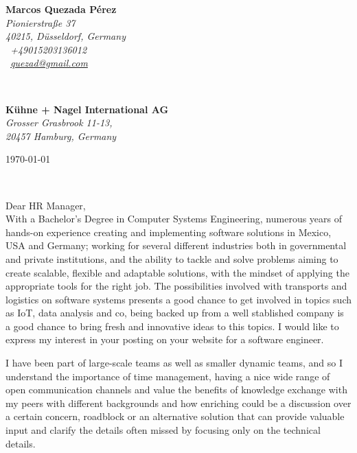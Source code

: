 \documentclass[a4paper,nonstopmode,9.5pt]{article}
\renewcommand{\sffamily}{\rmfamily}
\begin{document}
\sffamily   %
\hfill%
\begin{minipage}[t]{.6\textwidth}
\raggedleft%
{\bfseries Marcos Quezada Pérez}\\[.35ex]
\small\itshape%
Pionierstraße 37\\
40215, Düsseldorf, Germany\\[.35ex]
\Telefon~+49015203136012\\
\Letter~\href{mailto:quezad@gmail.com}{quezad@gmail.com}
\end{minipage}\\[1em]
%
\begin{minipage}[t]{.4\textwidth}
\raggedright%
{\bfseries Kühne + Nagel International AG}\\[.35ex]
\small\itshape%
Grosser Grasbrook 11-13,\\
20457 Hamburg, Germany
\end{minipage}
\hfill %
\begin{minipage}[t]{.4\textwidth}
\raggedleft %
\today
\end{minipage}\\[2em]
\raggedright
Dear HR Manager,\\[1.5em]
%
With a Bachelor’s Degree in Computer Systems Engineering, numerous years of hands-on experience creating and implementing software solutions in Mexico, USA and Germany; working for several different industries both in governmental and private institutions,
and the ability to tackle and solve problems aiming to create scalable, flexible and adaptable solutions, with the mindset of applying the appropriate tools for the right job. The possibilities involved with transports and logistics on software systems presents
a good chance to get involved in topics such as IoT, data analysis and co, being backed up from a well stablished company is a good chance to bring fresh and innovative ideas to this topics. I would like to express my interest in your posting on your website for a software engineer.

I have been part of large-scale teams as well as smaller dynamic teams, and so I understand the importance of time management, having a nice wide range of open communication channels and value the benefits of knowledge exchange with my peers with different backgrounds 
and how enriching could be a discussion over a certain concern, roadblock or an alternative solution that can provide valuable input and clarify the details often missed by focusing only on the technical details. 
\end{document}
